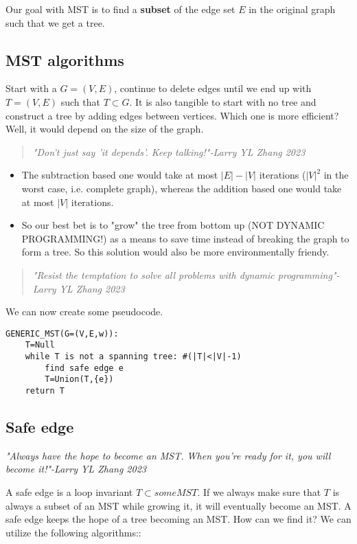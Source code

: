\documentclass[12pt]{book}
\begin{document}
Our goal with MST is to find a \textbf{subset} of the edge set $E$ in the original graph such that we get a tree.

\subsection*{MST algorithms}

Start with a $G=(V,E)$, continue to delete edges until we end up with $T=(V,E)$ such that $T\subset G$. It is also tangible to start with no tree and construct a tree by adding edges between vertices. Which one is more efficient? Well, it would depend on the size of the graph.

\begin{quote}
    \textit{"Don't just say 'it depends'. Keep talking!"-Larry YL Zhang 2023}
\end{quote}

\begin{itemize}
    \item The subtraction based one would take at most $|E|-|V|$ iterations ($|V|^2$ in the worst case, i.e. complete graph), whereas the addition based one would take at most $|V|$ iterations.
    \item So our best bet is to "grow" the tree from bottom up (NOT DYNAMIC PROGRAMMING!) as a means to save time instead of breaking the graph to form a tree. So this solution would also be more environmentally friendy.
\end{itemize}

\begin{quote}
    \textit{"Resist the temptation to solve all problems with dynamic programming"-Larry YL Zhang 2023}
\end{quote}
We can now create some pseudocode.
\begin{lstlisting}
GENERIC_MST(G=(V,E,w)):
    T=Null
    while T is not a spanning tree: #(|T|<|V|-1)
        find safe edge e
        T=Union(T,{e})
    return T

\end{lstlisting}

\subsection*{Safe edge}
\textit{"Always have the hope to become an MST. When you're ready for it, you will become it!"-Larry YL Zhang 2023}

A safe edge is a loop invariant $T\subset some MST$. If we always make sure that $T$ is always a subset of an MST while growing it, it will eventually become an MST. A safe edge keeps the hope of a tree becoming an MST. How can we find it? We can utilize the following algorithms::
\end{document}
